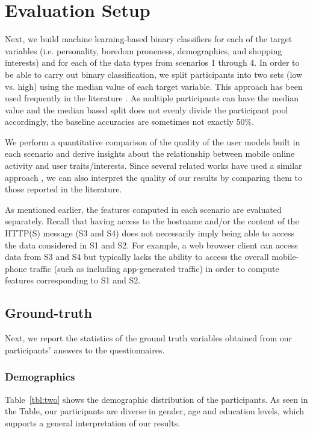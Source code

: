 \section{Evaluation Setup}
Next, we build machine learning-based binary classifiers for each of the target variables (i.e. personality, boredom proneness, demographics, and shopping interests) and for each of the data types from scenarios 1 through 4. In order to be able to carry out binary classification, we split participants into two sets (low vs. high) using the median value of each target variable. This approach has been used frequently in the literature \cite{chittaranjan2013mining, de2013predicting, staiano2014money}. As multiple participants can have the median value and the median based split does not evenly divide the participant pool accordingly, the baseline accuracies are sometimes not exactly 50\%. 

We perform a quantitative comparison of the quality of the user models built in each scenario and derive insights about the relationship between mobile online activity and user traits/interests. Since several related works have used a similar approach \cite{chittaranjan2013mining, de2013predicting, staiano2014money}, we can also interpret the quality of our results by comparing them to those reported in the literature. 

As mentioned earlier, the features computed in each scenario are evaluated separately. Recall that having access to the hostname and/or the content of the HTTP(S) message (S3 and S4) does not necessarily imply being able to access the data considered in S1 and S2. For example, a web browser client can access data from S3 and S4 but typically lacks the ability to access the overall mobile-phone traffic (such as including app-generated traffic) in order to compute features corresponding to S1 and S2.

\subsection{Ground-truth}
Next, we report the statistics of the ground truth variables obtained from our participants' answers to the questionnaires.

\subsubsection{Demographics}
Table~\ref{tbl:two} shows the demographic distribution of the participants. As seen in the Table, our participants are diverse in gender, age and education levels, which supports a general interpretation of our results.

